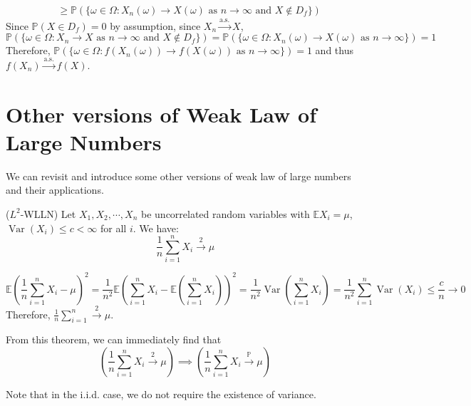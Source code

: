 \documentclass{huhtakm-template-book}
\newcommand{\prob}{\mathbb{P}}
\newcommand{\expect}{\mathbb{E}}
\DeclareMathOperator{\Var}{Var}
\begin{document}
\begin{proofing}
\begin{enumerate}
\begin{align*}
			&\geq\prob(\{\omega\in\Omega:X_{n}(\omega)\to X(\omega)\text{ as }n\to\infty\text{ and }X\not\in D_{f}\})
		\end{align*}
		Since $\prob(X\in D_{f})=0$ by assumption, since $X_{n}\xrightarrow{\text{a.s.}}X$,
		\begin{equation*}
			\prob(\{\omega\in\Omega:X_{n}\to X\text{ as }n\to\infty\text{ and }X\not\in D_{f}\})=\prob(\{\omega\in\Omega:X_{n}(\omega)\to X(\omega)\text{ as }n\to\infty\})=1
		\end{equation*}
		Therefore, $\prob(\{\omega\in\Omega:f(X_{n}(\omega))\to f(X(\omega))\text{ as }n\to\infty\})=1$ and thus $f(X_{n})\xrightarrow{\text{a.s.}}f(X)$.
	\end{enumerate}
\end{proofing}
\section{Other versions of Weak Law of Large Numbers}
We can revisit and introduce some other versions of weak law of large numbers and their applications.
\begin{thm}($L^{2}$-WLLN) 
	Let $X_{1},X_{2},\cdots,X_{n}$ be uncorrelated random variables with $\expect X_{i}=\mu$, $\Var(X_{i})\leq c<\infty$ for all $i$. We have:
	\begin{equation*}
		\frac{1}{n}\sum_{i=1}^{n}X_{i}\xrightarrow{2}\mu
	\end{equation*}
\end{thm}
\begin{proofing}
	\begin{equation*}
		\expect\left(\frac{1}{n}\sum_{i=1}^{n}X_{i}-\mu\right)^{2}=\frac{1}{n^{2}}\expect\left(\sum_{i=1}^{n}X_{i}-\expect \left(\sum_{i=1}^{n}X_{i}\right)\right)^{2}=\frac{1}{n^{2}}\Var\left(\sum_{i=1}^{n}X_{i}\right)=\frac{1}{n^{2}}\sum_{i=1}^{n}\Var(X_{i})\leq\frac{c}{n}\to 0
	\end{equation*}
	Therefore, $\frac{1}{n}\sum_{i=1}^{n}\xrightarrow{2}\mu$.
\end{proofing}
\begin{rem}
	From this theorem, we can immediately find that
	\begin{equation*}
		\left(\frac{1}{n}\sum_{i=1}^{n}X_{i}\xrightarrow{2}\mu\right)\implies\left(\frac{1}{n}\sum_{i=1}^{n}X_{i}\xrightarrow{\prob}\mu\right)
	\end{equation*}
\end{rem}
\begin{rem}
	Note that in the i.i.d. case, we do not require the existence of variance.
\end{rem}
\end{document}
